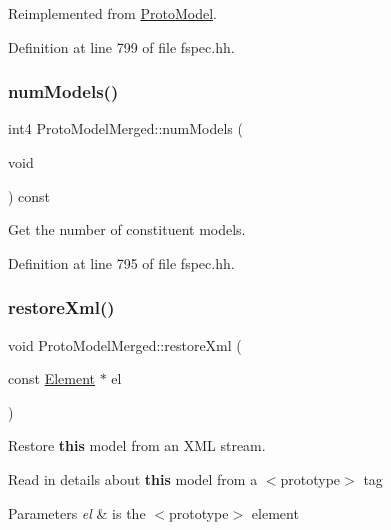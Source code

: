 Reimplemented from \mbox{\hyperlink{class_proto_model_a580207b945d3734b6f1e6023b3ca2678}{Proto\+Model}}.



Definition at line 799 of file fspec.\+hh.

\mbox{\label{class_proto_model_merged_a529627f8459b79d8f6d0e70210425ba2}} 
\subsubsection{\texorpdfstring{numModels()}{numModels()}}
{\footnotesize\ttfamily int4 Proto\+Model\+Merged\+::num\+Models (\begin{DoxyParamCaption}\item[{void}]{ }\end{DoxyParamCaption}) const\hspace{0.3cm}{\ttfamily [inline]}}



Get the number of constituent models. 



Definition at line 795 of file fspec.\+hh.

\mbox{\label{class_proto_model_merged_a1c80c617c086b0edacb483f8315d12e9}} 
\subsubsection{\texorpdfstring{restoreXml()}{restoreXml()}}
{\footnotesize\ttfamily void Proto\+Model\+Merged\+::restore\+Xml (\begin{DoxyParamCaption}\item[{const \mbox{\hyperlink{class_element}{Element}} $\ast$}]{el }\end{DoxyParamCaption})\hspace{0.3cm}{\ttfamily [virtual]}}



Restore {\bfseries{this}} model from an X\+ML stream. 

Read in details about {\bfseries{this}} model from a $<$prototype$>$ tag 
\begin{DoxyParams}{Parameters}
{\em el} & is the $<$prototype$>$ element \\
\hline
\end{DoxyParams}


